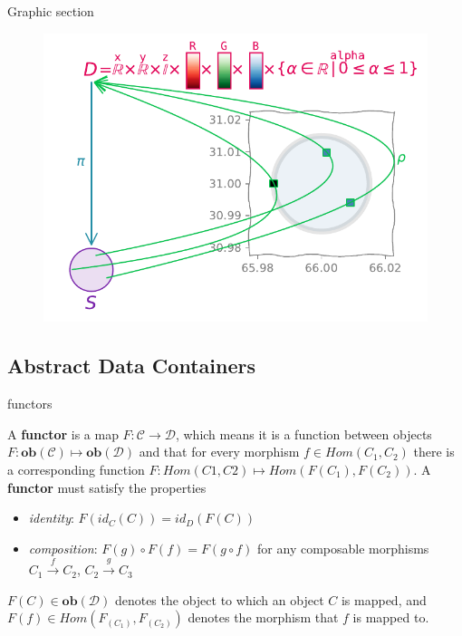 \documentclass[xcolor={dvipsnames}]{beamer}
\begin{document}
\begin{frame}{Graphic section}
\begin{figure}
    \includegraphics[width=\linewidth]{../paper/figures/fb_rho.pdf}
\end{figure}
\end{frame}

\subsection{Abstract Data Containers}

\begin{frame}{functors}
    \begin{definition}\cite{bradleyWhatFunctorDefinitions,bradleyTopologyCategoricalApproach2020} A \textbf{functor} is a map $F: \mathcal{C} \rightarrow \mathcal{D}$, which means it is a function between objects $F: \textbf{ob}(\mathcal{C}) \mapsto \textbf{ob}(\mathcal{D})$ and that for every morphism $f \in Hom(C_1, C_2)$  there is a corresponding function $F: Hom(C1, C2) \mapsto Hom(F(C_1), F( C_2))$.
        A \textbf{functor} must satisfy the properties
        \begin{itemize}
          \item \textit{identity}: $F(id_{C}(C)) = id_{D}(F(C))$
          \item \textit{composition}: $F(g)\circ F(f) = F(g\circ f)$ for any composable morphisms $C_{1}\xrightarrow{f} C_2$, $C_2 \xrightarrow{g} C_3$
        \end{itemize}
        $F(C) \in \textbf{ob}(\mathcal{D})$ denotes the object to which an object $C$ is mapped, and $F(f) \in Hom(F_(C_1), F_(C_2))$ denotes the morphism that $f$ is mapped to.
        \end{definition}
\end{frame}
\end{document}
